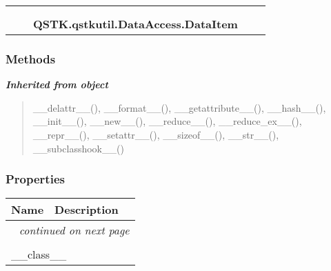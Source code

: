     \label{QSTK:qstkutil:DataAccess:DataItem}
\begin{tabular}{cccccc}
\multicolumn{2}{r}{\settowidth{\BCL}{object}\multirow{2}{\BCL}{object}}
&&
  \\\cline{3-3}
  &&\multicolumn{1}{c|}{}
&&
  \\
&&\multicolumn{2}{l}{\textbf{QSTK.qstkutil.DataAccess.DataItem}}
\end{tabular}



  \subsubsection{Methods}


\large{\textbf{\textit{Inherited from object}}}

\begin{quote}
\_\_delattr\_\_(), \_\_format\_\_(), \_\_getattribute\_\_(), \_\_hash\_\_(), \_\_init\_\_(), \_\_new\_\_(), \_\_reduce\_\_(), \_\_reduce\_ex\_\_(), \_\_repr\_\_(), \_\_setattr\_\_(), \_\_sizeof\_\_(), \_\_str\_\_(), \_\_subclasshook\_\_()
\end{quote}


  \subsubsection{Properties}

    \vspace{-1cm}
\hspace{\varindent}\begin{longtable}{|p{\varnamewidth}|p{\vardescrwidth}|l}
\cline{1-2}
\cline{1-2} \centering \textbf{Name} & \centering \textbf{Description}& \\
\cline{1-2}
\endhead\cline{1-2}\multicolumn{3}{r}{\small\textit{continued on next page}}\\\endfoot\cline{1-2}
\endlastfoot\multicolumn{2}{|l|}{\textit{Inherited from object}}\\
\multicolumn{2}{|p{\varwidth}|}{\raggedright \_\_class\_\_}\\
\cline{1-2}
\end{longtable}


